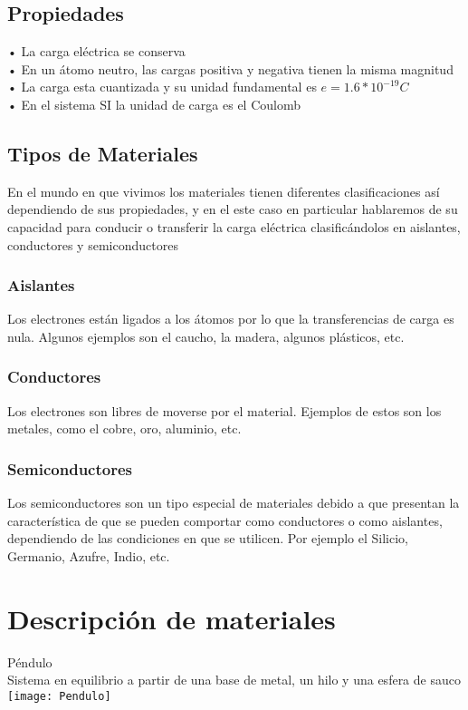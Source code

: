 \documentclass[14pt]{article}
\begin{document}
\begin{multicols}{2}
		\subsection{Propiedades}
		• La carga eléctrica se conserva \\
		• En un átomo neutro, las cargas 
		positiva y negativa tienen la misma
		magnitud \\
		• La carga esta cuantizada y su
		unidad fundamental es
		$e = 1.6*10^{-19}C$ \\
		• En el sistema SI la unidad de
		carga es el Coulomb \\
	\subsection{Tipos de Materiales}
	En el mundo en que vivimos los materiales tienen diferentes clasificaciones así dependiendo de sus propiedades, y en el este caso en particular hablaremos de su capacidad para conducir o transferir la carga eléctrica clasificándolos en aislantes, conductores y semiconductores 
	\subsubsection{Aislantes}
	Los electrones están ligados a los átomos por lo que la transferencias de carga es nula. Algunos ejemplos son el caucho, la madera, algunos plásticos, etc. 
	\subsubsection{Conductores}
	Los electrones son libres de moverse por el material. Ejemplos de estos son los metales, como el cobre, oro, aluminio, etc.
	\subsubsection{Semiconductores}
	Los semiconductores son un tipo especial de materiales debido a que
	presentan la característica de que se pueden comportar como conductores
	o como aislantes, dependiendo de las condiciones en que se utilicen. Por ejemplo el Silicio, Germanio, Azufre, Indio, etc. 

	\section{Descripción de materiales}
Péndulo\\
Sistema en equilibrio a partir de una base de metal, un hilo y una esfera de sauco
\texttt{[image: Pendulo]}


\end{multicols}
\end{document}
